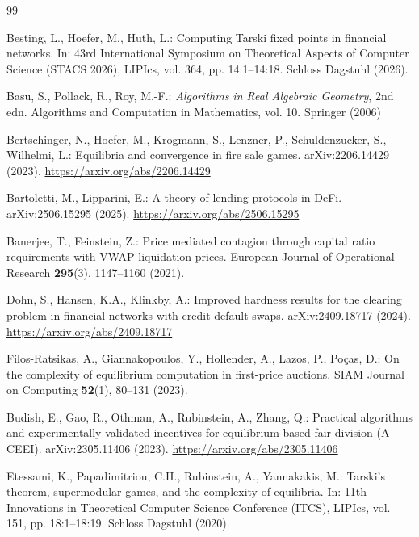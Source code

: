 \documentclass{llncs}
\begin{document}
\begin{thebibliography}{99}

Besting, L., Hoefer, M., Huth, L.:
Computing Tarski fixed points in financial networks.
In: 43rd International Symposium on Theoretical Aspects of Computer Science (STACS 2026), LIPIcs, vol. 364, pp. 14:1--14:18. Schloss Dagstuhl (2026). 

Basu, S., Pollack, R., Roy, M.-F.:
\emph{Algorithms in Real Algebraic Geometry}, 2nd edn.
Algorithms and Computation in Mathematics, vol. 10. Springer (2006)

Bertschinger, N., Hoefer, M., Krogmann, S., Lenzner, P., Schuldenzucker, S., Wilhelmi, L.:
Equilibria and convergence in fire sale games.
arXiv:2206.14429 (2023). \url{https://arxiv.org/abs/2206.14429}

Bartoletti, M., Lipparini, E.:
A theory of lending protocols in DeFi.
arXiv:2506.15295 (2025). \url{https://arxiv.org/abs/2506.15295}

Banerjee, T., Feinstein, Z.:
Price mediated contagion through capital ratio requirements with VWAP liquidation prices.
European Journal of Operational Research \textbf{295}(3), 1147--1160 (2021).

Dohn, S., Hansen, K.A., Klinkby, A.:
Improved hardness results for the clearing problem in financial networks with credit default swaps.
arXiv:2409.18717 (2024). \url{https://arxiv.org/abs/2409.18717}

Filos-Ratsikas, A., Giannakopoulos, Y., Hollender, A., Lazos, P., Po\c{c}as, D.:
On the complexity of equilibrium computation in first-price auctions.
SIAM Journal on Computing \textbf{52}(1), 80--131 (2023). 

Budish, E., Gao, R., Othman, A., Rubinstein, A., Zhang, Q.:
Practical algorithms and experimentally validated incentives for equilibrium-based fair division (A-CEEI).
arXiv:2305.11406 (2023). \url{https://arxiv.org/abs/2305.11406}





Etessami, K., Papadimitriou, C.H., Rubinstein, A., Yannakakis, M.:
Tarski's theorem, supermodular games, and the complexity of equilibria.
In: 11th Innovations in Theoretical Computer Science Conference (ITCS), LIPIcs, vol. 151, pp. 18:1--18:19. Schloss Dagstuhl (2020). 


\end{thebibliography}
\end{document}

